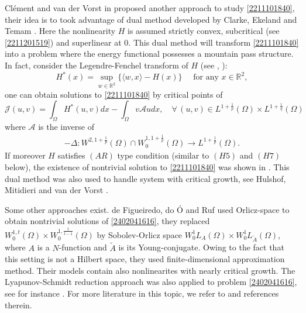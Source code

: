 \documentclass[10pt]{article}
\numberwithin{equation}{section}
\numberwithin{equation}{section}
\begin{document}
Cl\'ement and van der Vorst in \cite{CV1995} proposed another approach to study  \eqref{2211101840}, their idea is to took advantage of dual method developed by Clarke, Ekeland and Temam \cite{CE_CPAM1980, ET1999}. Here the nonlinearity $H$ is assumed strictly convex, subcritical (see \eqref{2211201519}) and superlinear at 0. This dual method will transform \eqref{2211101840} into a problem where the energy functional possesses a mountain pass structure. In fact, consider
the Legendre-Fenchel transform of $H$ (see \cite{ET1999}, \cite[Chapter I, Section 6]{Struwe2008}):
\[
 H^*(x)=\underset{w\in \mathbb{R}^2}{\sup}\big\{\langle w, x\rangle -H(x)\big\}\quad \mbox{ for any } x \in \mathbb{R}^2,
\]
one can obtain solutions to \eqref{2211101840} by critical points of
\begin{equation}\label{2211011351}
\mathcal{J}(u, v)=\int_{\Omega}{H}^*(u, v) dx-\int_{\Omega}v\mathcal{A}u dx,\quad \forall \, (u, v)\in L^{1+\frac1p}(\Omega)\times L^{1+\frac1q}(\Omega)
\end{equation}
where $\mathcal{A}$ is the inverse of
\begin{align}
\label{isop}
-\Delta : W^{2, 1+\frac1p}(\Omega)\cap W_0^{1, 1+\frac1p}(\Omega)\to L^{1+\frac1p}(\Omega).
\end{align}
If moreover $H$ satisfies $(AR)$ type condition (similar to $(H5)$ and $(H7)$ below), the existence of nontrivial solution to \eqref{2211101840} was shown in \cite{CV1995}. This dual method was also used to handle system with critical growth, see Hulshof, Mitidieri and van der Vorst \cite{HMv1998}.

Some other approaches exist. de Figueiredo, do \'{O} and Ruf \cite{ddR_JFA2005} used Orlicz-space to obtain nontrivial solutions of \eqref{2402041616}, they replaced $W_0^{1,t}(\Omega)\times W_0^{1,\frac{t}{t-1}}(\Omega)$ by Sobolev-Orlicz space $W_0^1L_A(\Omega)\times W_0^1L_{\widetilde A}(\Omega)$, where $A$ is a $N$-function and ${\widetilde A}$ is its Young-conjugate. Owing to the fact that this setting is not a Hilbert space, they used finite-dimensional approximation method. Their models contain also nonlinearites with nearly critical growth.
The Lyapunov-Schmidt reduction approach was also applied to problem \eqref{2402041616}, see for instance \cite{RTZ2009, RT2008}. For more literature in this topic, we refer to \cite{BdT2014} and references therein.
\end{document}
